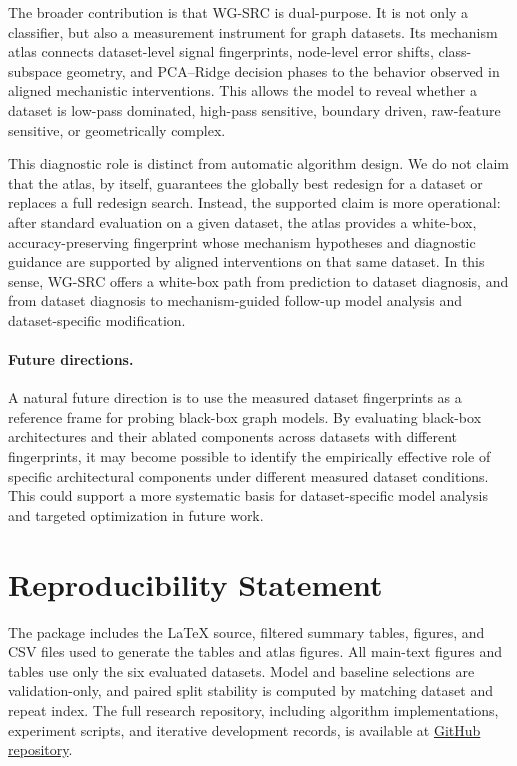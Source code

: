 \documentclass{article}
\newcommand{\SRC}{\textsc{WG-SRC}}
\begin{document}
The broader contribution is that \SRC{} is dual-purpose. It is not only a
classifier, but also a measurement instrument for graph datasets. Its
mechanism atlas connects dataset-level signal fingerprints, node-level error
shifts, class-subspace geometry, and PCA--Ridge decision phases to the
behavior observed in aligned mechanistic interventions. This allows the model
to reveal whether a dataset is low-pass dominated, high-pass sensitive,
boundary driven, raw-feature sensitive, or geometrically complex.

This diagnostic role is distinct from automatic algorithm design. We do not
claim that the atlas, by itself, guarantees the globally best redesign for a
dataset or replaces a full redesign search. Instead, the supported claim is more operational: after standard evaluation on
a given dataset, the atlas provides a white-box, accuracy-preserving
fingerprint whose mechanism hypotheses and diagnostic guidance are supported by
aligned interventions on that same dataset. In this sense, \SRC{} offers a
white-box path from prediction to dataset diagnosis, and from dataset diagnosis
to mechanism-guided follow-up model analysis and dataset-specific modification.

\paragraph{Future directions.}
A natural future direction is to use the measured dataset fingerprints as a
reference frame for probing black-box graph models. By evaluating black-box
architectures and their ablated components across datasets with different
fingerprints, it may become possible to identify the empirically effective
role of specific architectural components under different measured dataset
conditions. This could support a more systematic basis for dataset-specific
model analysis and targeted optimization in future work.

\section*{Reproducibility Statement}
The package includes the LaTeX source, filtered summary tables, figures, and
CSV files used to generate the tables and atlas figures. All main-text figures
and tables use only the six evaluated datasets. Model and baseline selections
are validation-only, and paired split stability is computed by matching dataset
and repeat index. The full research repository, including algorithm
implementations, experiment scripts, and iterative development records, is
available at \href{https://github.com/xkfkh/A-White-Box-Graph-Subspace-Ridge-Classifier-with-Node-Level-Signal-Atlases}{GitHub repository}.
\end{document}
